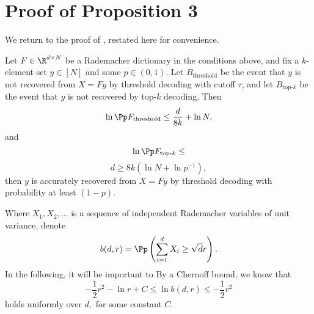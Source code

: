 \section{Proof of Proposition 3 \label{appendix:proofs}}

We return to the proof of , restated here for convenience.

\begin{proposition*}
	Let $F \in \R^{d \times N}$ be a Rademacher dictionary in the conditions above, and fix a $k$-element set $y \in [N]$ and some $p \in (0, 1).$
	Let $B_\text{threshold}$ be the event that $y$ is not recovered from $X = F y$ by threshold decoding with cutoff $\tau$, and let $B_{\text{top-}k}$ be the event that $y$ is not recovered by top-$k$ decoding. Then
	$$
	\ln \Pp F_\text{threshold} \le \frac{d}{8k} + \ln N,
	$$
	and
	$$
	\ln \Pp F_{\text{top-}k} \le
	$$
	$$
		d \ge 8 k (\ln N + \ln p^{-1}),
	$$
	then $y$ is accurately recovered from $X = F y$ by threshold decoding with probability at least $(1 - p).$
\end{proposition*}

Where $X_1, X_2, \dots$ is a sequence of independent Rademacher variables of unit variance, denote
$$
	b(d, r) = \Pp \left(\sum_{i = 1}^d X_i \ge \sqrt{d} r \right).
$$
In the following, it will be important to
By a Chernoff bound, we know that
\begin{equation}
- \frac 1 2 r^2 - \ln r + C \le \ln b(d, r) \le - \frac 1 2 r^2 \label{eq:b-chernoff}
\end{equation}
holds uniformly over $d,$ for some constant $C.$


